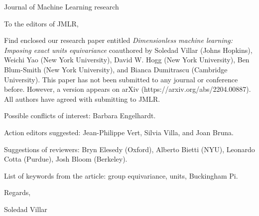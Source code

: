 \documentclass[fontsize=12pt, paper=a4]{scrlttr2}
\begin{document}
\begin{letter}{Journal of Machine Learning research}

\opening{To the editors of JMLR,}  %

Find enclosed our research paper entitled \emph{Dimensionless machine learning: Imposing exact units equivariance} coauthored by Soledad Villar (Johns Hopkins), Weichi Yao (New York University), David W. Hogg (New York University), Ben Blum-Smith (New York University), and Bianca Dumitrascu (Cambridge University). This paper has not been submitted to any journal or conference before. However, a version appears on arXiv (https://arxiv.org/abs/2204.00887).
All authors have agreed with submitting to JMLR. 

Possible conflicts of interest: Barbara Engelhardt.

Action editors suggested: Jean-Philippe Vert, Silvia Villa, and Joan Bruna.

Suggestions of reviewers: Bryn Elesedy (Oxford), Alberto Bietti (NYU), Leonardo Cotta (Purdue), Josh Bloom (Berkeley).

List of keywords from the article: group equivariance, units, Buckingham Pi.

\closing{Regards,}
Soledad Villar %

\end{letter}
\end{document}
